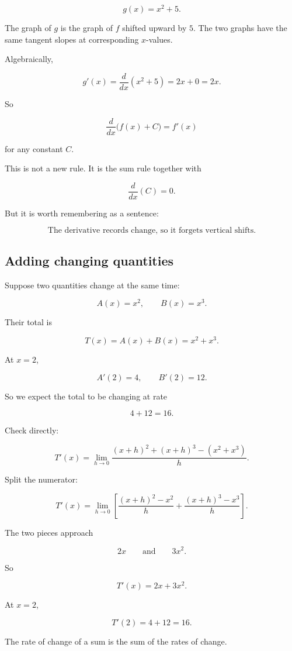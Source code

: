 \[
g(x)=x^2+5.
\]

The graph of \(g\) is the graph of \(f\) shifted upward by \(5\).  The two graphs have the same tangent slopes at corresponding \(x\)-values.

Algebraically,

\[
g'(x)
=
\frac{d}{dx}(x^2+5)
=
2x+0
=
2x.
\]

So

\[
\boxed{
\frac{d}{dx}\bigl(f(x)+C\bigr)=f'(x)
}
\]

for any constant \(C\).

This is not a new rule.  It is the sum rule together with

\[
\frac{d}{dx}(C)=0.
\]

But it is worth remembering as a sentence:

\[
\boxed{
\text{The derivative records change, so it forgets vertical shifts.}
}
\]

\subsection{Adding changing quantities}
\label{subsec:sum-rule-ch5}

Suppose two quantities change at the same time:

\[
A(x)=x^2,
\qquad
B(x)=x^3.
\]

Their total is

\[
T(x)=A(x)+B(x)=x^2+x^3.
\]

At \(x=2\),

\[
A'(2)=4,
\qquad
B'(2)=12.
\]

So we expect the total to be changing at rate

\[
4+12=16.
\]

Check directly:

\[
T'(x)
=
\lim_{h\to0}\frac{(x+h)^2+(x+h)^3-(x^2+x^3)}{h}.
\]

Split the numerator:

\[
T'(x)
=
\lim_{h\to0}
\left[
\frac{(x+h)^2-x^2}{h}
+
\frac{(x+h)^3-x^3}{h}
\right].
\]

The two pieces approach

\[
2x
\qquad\text{and}\qquad
3x^2.
\]

So

\[
T'(x)=2x+3x^2.
\]

At \(x=2\),

\[
T'(2)=4+12=16.
\]

The rate of change of a sum is the sum of the rates of change.

